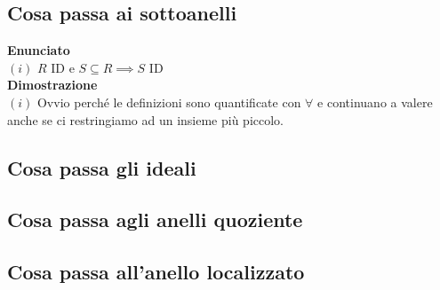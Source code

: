 \documentclass[a4paper,GeneralMath,NoNotes]{stdmdoc}
\newcommand{\Enunciato}{\vskip 0.05cm \noindent \textbf{Enunciato} \\ }
\renewcommand{\Dimostrazione}{\vskip 0.05cm \noindent \textbf{Dimostrazione} \\ }
\begin{document}
	\subsection{Cosa passa ai sottoanelli}
	\Enunciato
		$(i)$ $R$ ID e $S \subseteq R \implies S$ ID \\

	\Dimostrazione
		$(i)$ Ovvio perché le definizioni sono quantificate con $\forall$ e continuano a valere anche se ci restringiamo ad un insieme più piccolo.

	\subsection{Cosa passa gli ideali}

	\subsection{Cosa passa agli anelli quoziente}

	\subsection{Cosa passa all'anello localizzato}
\end{document}
